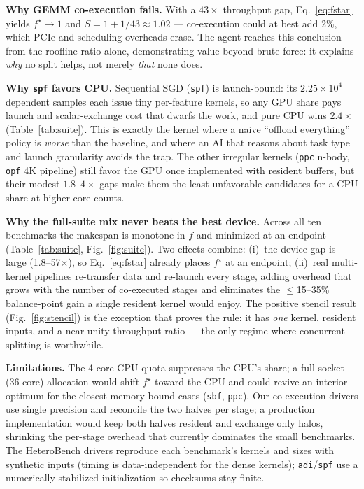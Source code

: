 \documentclass[conference]{IEEEtran}
\begin{document}
\textbf{Why GEMM co-execution fails.} With a $43\times$ throughput gap, Eq.~\ref{eq:fstar}
yields $f^\star\!\to\!1$ and $S=1+1/43\approx1.02$ --- co-execution could at best add
$2\%$, which PCIe and scheduling overheads erase. The agent reaches this conclusion from
the roofline ratio alone, demonstrating value beyond brute force: it explains \emph{why} no
split helps, not merely \emph{that} none does.

\textbf{Why \texttt{spf} favors CPU.} Sequential SGD (\texttt{spf}) is launch-bound: its
$2.25{\times}10^4$ dependent samples each issue tiny per-feature kernels, so any GPU share
pays launch and scalar-exchange cost that dwarfs the work, and pure CPU wins $2.4\times$
(Table~\ref{tab:suite}). This is exactly the kernel where a naive ``offload everything''
policy is \emph{worse} than the baseline, and where an AI that reasons about task type and
launch granularity avoids the trap. The other irregular kernels (\texttt{ppc} n-body,
\texttt{opf} 4K pipeline) still favor the GPU once implemented with resident buffers, but
their modest $1.8$--$4\times$ gaps make them the least unfavorable candidates for a CPU
share at higher core counts.

\textbf{Why the full-suite mix never beats the best device.} Across all ten benchmarks the
makespan is monotone in $f$ and minimized at an endpoint (Table~\ref{tab:suite},
Fig.~\ref{fig:suite}). Two effects combine: (i)~the device gap is large (1.8--57$\times$),
so Eq.~\ref{eq:fstar} already places $f^\star$ at an endpoint; (ii)~real multi-kernel
pipelines re-transfer data and re-launch every stage, adding overhead that grows with the
number of co-executed stages and eliminates the $\le$15--35\% balance-point gain a single
resident kernel would enjoy. The positive stencil result (Fig.~\ref{fig:stencil}) is the
exception that proves the rule: it has \emph{one} kernel, resident inputs, and a near-unity
throughput ratio --- the only regime where concurrent splitting is worthwhile.

\textbf{Limitations.} The 4-core CPU quota suppresses the CPU's share; a full-socket
(36-core) allocation would shift $f^\star$ toward the CPU and could revive an interior
optimum for the closest memory-bound cases (\texttt{sbf}, \texttt{ppc}). Our co-execution
drivers use single precision and reconcile the two halves per stage; a production
implementation would keep both halves resident and exchange only halos, shrinking the
per-stage overhead that currently dominates the small benchmarks. The HeteroBench drivers
reproduce each benchmark's kernels and sizes with synthetic inputs (timing is
data-independent for the dense kernels); \texttt{adi}/\texttt{spf} use a numerically
stabilized initialization so checksums stay finite.
\end{document}
